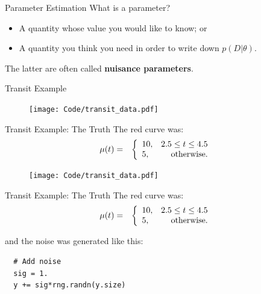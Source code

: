 \begin{frame}[t]{Parameter Estimation}
What is a parameter?

\begin{itemize}
\item A quantity whose value you would like to know; or
\item A quantity you think you need in order to write down
$p(D | \theta)$.
\end{itemize}

The latter are often called {\bf nuisance parameters}.
\end{frame}

\begin{frame}[t]{Transit Example}
\begin{figure}
\texttt{[image: Code/transit\_data.pdf]}
\end{figure}
\end{frame}

\begin{frame}[t]{Transit Example: The Truth}
The red curve was:
\begin{eqnarray}
\mu(t) &=& \left\{
\begin{array}{lr}
10, & 2.5 \leq t \leq 4.5\\
5,  & \textnormal{otherwise}.
\end{array}
\right.
\end{eqnarray}

\begin{figure}
\texttt{[image: Code/transit\_data.pdf]}
\end{figure}
\end{frame}

\begin{frame}[fragile, t]{Transit Example: The Truth}
The red curve was:
\begin{eqnarray}
\mu(t) &=& \left\{
\begin{array}{lr}
10, & 2.5 \leq t \leq 4.5\\
5,  & \textnormal{otherwise}.
\end{array}
\right.
\end{eqnarray}

and the noise was generated like this:
\begin{verbatim}
  # Add noise
  sig = 1.
  y += sig*rng.randn(y.size)
\end{verbatim}
\end{frame}



